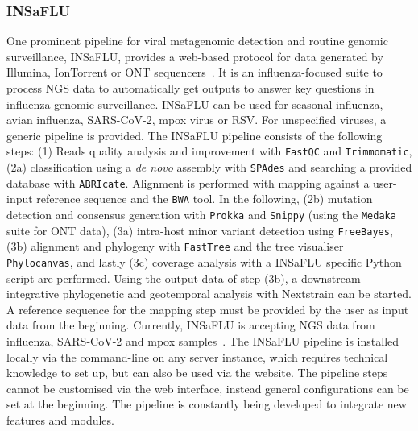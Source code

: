 \subsubsection{INSaFLU}
One prominent pipeline for viral metagenomic detection and routine genomic surveillance, \ac{INSaFLU}, provides a web-based protocol for data generated by Illumina, IonTorrent or \ac{ONT} sequencers~\cite{borges2018insaflu}. It is an influenza-focused suite to process \ac{NGS} data to automatically get outputs to answer key questions in influenza genomic surveillance. \ac{INSaFLU} can be used for seasonal influenza, avian influenza, \ac{SARS-CoV-2}, mpox virus or \ac{RSV}. For unspecified viruses, a generic pipeline is provided. The \ac{INSaFLU} pipeline consists of the following steps: (1) Reads quality analysis and improvement with \texttt{FastQC} and \texttt{Trimmomatic}, (2a) classification using a \textit{de novo} assembly with \texttt{SPAdes} and searching a provided database with \texttt{ABRIcate}. Alignment is performed with mapping against a user-input reference sequence and the \texttt{BWA} tool. In the following, (2b) mutation detection and consensus generation with \texttt{Prokka} and \texttt{Snippy} (using the \texttt{Medaka} suite for \ac{ONT} data), (3a) intra-host minor variant detection using \texttt{FreeBayes}, (3b) alignment and phylogeny with \texttt{FastTree} and the tree visualiser \texttt{Phylocanvas}, and lastly (3c) coverage analysis with a \ac{INSaFLU} specific Python script are performed. Using the output data of step (3b), a downstream integrative phylogenetic and geotemporal analysis with Nextstrain can be started. A reference sequence for the mapping step must be provided by the user as input data from the beginning. Currently, \ac{INSaFLU} is accepting \ac{NGS} data from influenza, \ac{SARS-CoV-2} and mpox samples~\cite{borges2018insaflu}. The \ac{INSaFLU} pipeline is installed locally via the command-line on any server instance, which requires technical knowledge to set up, but can also be used via the website. The pipeline steps cannot be customised via the web interface, instead general configurations can be set at the beginning. The pipeline is constantly being developed to integrate new features and modules.

